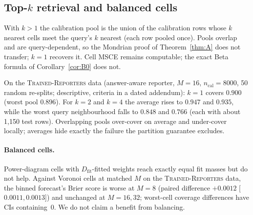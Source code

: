 \documentclass[twoside]{article}
\theoremstyle{definition}
\theoremstyle{remark}
\newcommand{\Dfit}{D_{\mathrm{fit}}}
\newcommand{\1}{\mathbf{1}}
\newcommand{\expname}[1]{\textsc{#1}}
\begin{document}
\subsection{Top-$k$ retrieval and balanced cells}
\label{sec:topk}
With $k>1$ the calibration pool is the union of the calibration rows whose $k$ nearest cells
meet the query's $k$ nearest (each row pooled once). Pools overlap and are query-dependent, so
the Mondrian proof of Theorem~\ref{thm:A} does not transfer; $k=1$ recovers it. Cell MSCE
remains computable; the exact Beta formula of Corollary~\ref{cor:B0} does not.

On the \expname{Trained-Reporters} data (answer-aware reporter, $M=16$, $n_{\mathrm{cal}}=8000$, 50 random re-splits;
descriptive, criteria in a dated addendum): $k=1$ covers $0.900$ (worst pool $0.896$). For
$k=2$ and $k=4$ the average rises to $0.947$ and $0.935$, while the worst query neighbourhood
falls to $0.848$ and $0.766$ (each with about 1{,}150 test rows). Overlapping pools over-cover
on average and under-cover locally; averages hide exactly the failure the partition guarantee
excludes.

\paragraph{Balanced cells.} Power-diagram cells with $\Dfit$-fitted weights reach
exactly equal fit masses but do not help. Against Voronoi cells at matched $M$ on the \expname{Trained-Reporters}
data, the binned forecast's Brier score is worse at $M=8$ (paired difference $+0.0012$
[$0.0011,0.0013$]) and unchanged at $M=16,32$; worst-cell coverage differences have CIs
containing~0. We do not claim a benefit from balancing.

\end{document}
